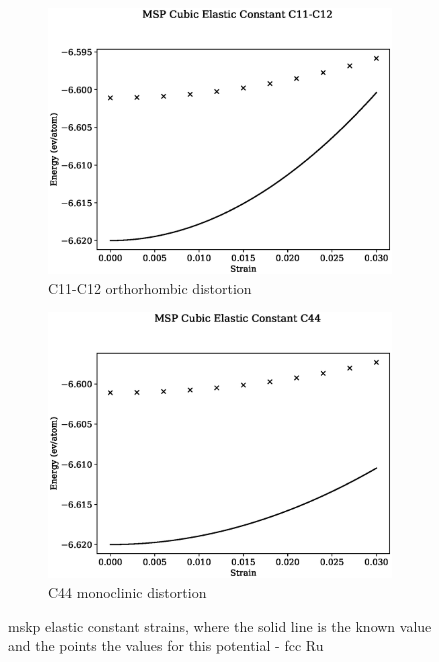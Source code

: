 \begin{figure}[htb]
\begin{subfigure}{.42\textwidth}
  \centering
  \includegraphics[width=.90\linewidth]{chapters/potentials_fe_pd_ru/feru_potential/ec_mskp/msp_c11_c12_plot_bp_2.eps}  
  \caption{C11-C12 orthorhombic distortion}
  \label{fig:feru-fefcc-c11c12}
\end{subfigure}
\begin{subfigure}{.42\textwidth}
  \centering
  \includegraphics[width=.90\linewidth]{chapters/potentials_fe_pd_ru/feru_potential/ec_mskp/msp_c44_plot_bp_2.eps}  
  \caption{C44 monoclinic distortion}
  \label{fig:feru-fefcc-c11c12c44}
\end{subfigure}
\label{fig:fig:fepd-fefcc-equation-of-state}
\caption{\acrshort{mskp} elastic constant strains, where the solid line is the known value and the points the values for this potential - \acrshort{fcc} Ru}
\end{figure}



